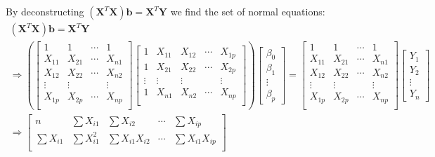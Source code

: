 \documentclass[11pt]{exam} %
\begin{document}
\begin{questions}
By deconstructing $(\mathbf{X}^T \mathbf{X}) \mathbf{b} = \mathbf{X}^T \mathbf{Y}$ we find the set of normal equations:
\begin{gather*}
(\mathbf{X}^T \mathbf{X}) \mathbf{b} = \mathbf{X}^T \mathbf{Y} \\ 
\Rightarrow \left(
  \begin{bmatrix}
  	1 & 1 & \cdots & 1 \\
  	X_{11} & X_{21} & \cdots & X_{n1} \\
  	X_{12} & X_{22} & \cdots & X_{n2} \\
    \vdots & \vdots &  & \vdots \\
  	X_{1p} & X_{2p} & \cdots & X_{np} \\
  \end{bmatrix}
  \begin{bmatrix}
    1 & X_{11} & X_{12} & \cdots & X_{1p} \\
    1 & X_{21} & X_{22} & \cdots & X_{2p} \\
    \vdots & \vdots & \vdots &  & \vdots \\
    1 & X_{n1} & X_{n2} & \cdots & X_{np} \\
  \end{bmatrix}
\right)
\begin{bmatrix}
    \beta_0 \\
    \beta_1 \\
    \vdots \\
    \beta_p
  \end{bmatrix}
=
  \begin{bmatrix}
  	1 & 1 & \cdots & 1 \\
  	X_{11} & X_{21} & \cdots & X_{n1} \\
  	X_{12} & X_{22} & \cdots & X_{n2} \\
    \vdots & \vdots &  & \vdots \\
  	X_{1p} & X_{2p} & \cdots & X_{np} \\
  \end{bmatrix}
  \begin{bmatrix}
    Y_1 \\
    Y_2 \\
    \vdots \\
    Y_n
  \end{bmatrix}
\\
\Rightarrow \begin{bmatrix}
  	n & \sum X_{i1} & \sum X_{i2} & \cdots & \sum X_{ip} \\
  	\sum X_{i1} & \sum X_{i1}^2 & \sum X_{i1} X_{i2 } & \cdots & \sum X_{i1} X_{ip} \\

\end{bmatrix}
\end{gather*}
\end{questions}
\end{document}

